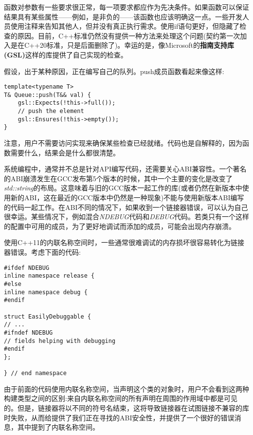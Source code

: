 
函数对参数有一些要求很正常，每一项要求都应作为先决条件。如果函数可以保证结果具有某些属性——例如，是非负的——该函数也应该明确这一点。一些开发人员使用注释来告知其他人，但并没有真正执行需求。使用if语句更好，但隐藏了检查的原因。目前，C++标准仍然没有提供一种方法来处理这个问题(契约第一次加入是在C++20标准，只是后面删除了)。幸运的是，像Microsoft的\textbf{指南支持库(GSL)}这样的库提供了自己实现的检查。

假设，出于某种原因，正在编写自己的队列。push成员函数看起来像这样:

\begin{lstlisting}[style=styleCXX]
template<typename T>
T& Queue::push(T&& val) {
	gsl::Expects(!this->full());
	// push the element
	gsl::Ensures(!this->empty());
}
\end{lstlisting}

注意，用户不需要访问实现来确保某些检查已经就绪。代码也是自解释的，因为函数需要什么，结果会是什么都很清楚。


系统编程中，通常并不总是针对API编写代码，还需要关心ABI兼容性。一个著名的ABI崩溃发生在GCC发布第5个版本的时候，其中一个主要的变化是改变了\textit{std::string}的布局。这意味着与旧的GCC版本一起工作的库(或者仍然在新版本中使用新的ABI，这在最近的GCC版本中仍然是一种现象)不能与使用新版本ABI编写的代码一起工作。在ABI不同的情况下，如果收到一个链接器错误，可以认为自己很幸运。某些情况下，例如混合\textit{NDEBUG}代码和\textit{DEBUG}代码。若类只有一个这样的配置中可用的成员，为了更好地调试而添加的成员，可能会出现内存崩溃。

使用C++11的内联名称空间时，一些通常很难调试的内存损坏很容易转化为链接器错误。考虑下面的代码:

\begin{lstlisting}[style=styleCXX]
#ifdef NDEBUG
inline namespace release {
#else
inline namespace debug {
#endif

struct EasilyDebuggable {
// ...
#ifndef NDEBUG
// fields helping with debugging
#endif
};

} // end namespace
\end{lstlisting}

由于前面的代码使用内联名称空间，当声明这个类的对象时，用户不会看到这两种构建类型之间的区别:来自内联名称空间的所有声明在周围的作用域中都是可见的。但是，链接器将以不同的符号名结束，这将导致链接器在试图链接不兼容的库时失败，从而给提供了我们正在寻找的ABI安全性，并提供了一个很好的错误消息，其中提到了内联名称空间。

